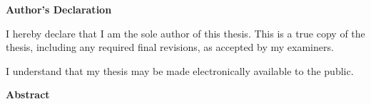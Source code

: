 \documentclass[letterpaper,12pt,titlepage,oneside,final]{book}
\let\origdoublepage\cleardoublepage
\newcommand{\clearemptydoublepage}{%
  \clearpage{\pagestyle{empty}\origdoublepage}}
\let\cleardoublepage\clearemptydoublepage
\begin{document}
  

\cleardoublepage
{}    %

 \begin{center}\textbf{Author's Declaration}\end{center}

 \noindent
I hereby declare that I am the sole author of this thesis. This is a true copy of the thesis, including any required final revisions, as accepted by my examiners.
 \noindent  
  \bigskip
  
  \noindent
I understand that my thesis may be made electronically available to the public.

\cleardoublepage
{}    %

\begin{center}\textbf{Abstract}\end{center}
\end{document}
